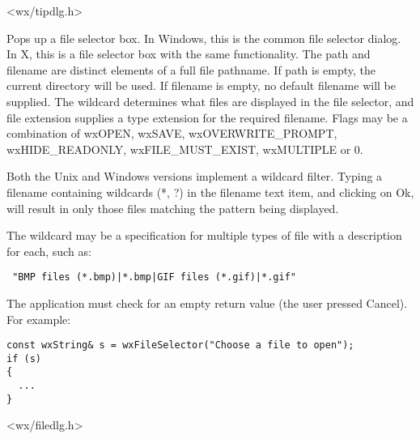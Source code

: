 


<wx/tipdlg.h>

\label{wxfileselector}


Pops up a file selector box. In Windows, this is the common file selector
dialog. In X, this is a file selector box with the same functionality.
The path and filename are distinct elements of a full file pathname.
If path is empty, the current directory will be used. If filename is empty,
no default filename will be supplied. The wildcard determines what files
are displayed in the file selector, and file extension supplies a type
extension for the required filename. Flags may be a combination of wxOPEN,
wxSAVE, wxOVERWRITE\_PROMPT, wxHIDE\_READONLY, wxFILE\_MUST\_EXIST, wxMULTIPLE or 0.

Both the Unix and Windows versions implement a wildcard filter. Typing a
filename containing wildcards (*, ?) in the filename text item, and
clicking on Ok, will result in only those files matching the pattern being
displayed.

The wildcard may be a specification for multiple types of file 
with a description for each, such as:

\begin{verbatim}
 "BMP files (*.bmp)|*.bmp|GIF files (*.gif)|*.gif"
\end{verbatim}

The application must check for an empty return value (the user pressed
Cancel). For example:

\begin{verbatim}
const wxString& s = wxFileSelector("Choose a file to open");
if (s)
{
  ...
}
\end{verbatim}


<wx/filedlg.h>

